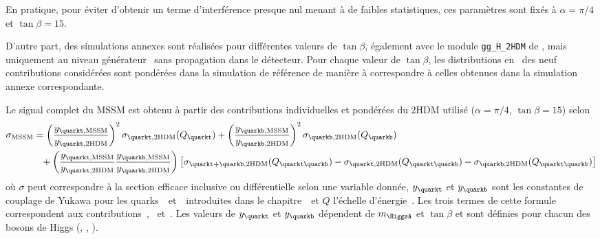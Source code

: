 En pratique, pour éviter d'obtenir un terme d'interférence presque nul menant à de faibles statistiques, ces paramètres sont fixés à $\alpha=\pi/4$ et $\tan\beta=15$.
\par
D'autre part, des simulations annexes sont réalisées pour différentes valeurs de $\tan\beta$, également avec le  module \texttt{gg\_H\_2HDM} de \POWHEG, mais uniquement au niveau générateur \ie\ sans propagation dans le détecteur.
Pour chaque valeur de $\tan\beta$, les distributions en \pT\ des neuf contributions considérées sont pondérées dans la simulation de référence de manière à correspondre à celles obtenues dans la simulation annexe correspondante.
\par
Le signal complet du MSSM est obtenu à partir des contributions individuelles et pondérées du 2HDM utilisé ($\alpha=\pi/4$, $\tan\beta=15$) selon
\begin{align}
\sigma_\text{MSSM} &=
\left(\frac{y_{\quarkt,\text{MSSM}}}{y_{\quarkt,\text{2HDM}}}\right)^2 \sigma_{\quarkt,\text{2HDM}}(Q_{\quarkt})
+
\left(\frac{y_{\quarkb,\text{MSSM}}}{y_{\quarkb,\text{2HDM}}}\right)^2 \sigma_{\quarkb,\text{2HDM}}(Q_{\quarkb})
\nonumber\\&\hphantom{=}
+
\left(\frac{y_{\quarkt,\text{MSSM}}}{y_{\quarkt,\text{2HDM}}}\frac{y_{\quarkb,\text{MSSM}}}{y_{\quarkb,\text{2HDM}}}\right)
\left[ \sigma_{\quarkt+\quarkb,\text{2HDM}}(Q_{\quarkt\quarkb}) - \sigma_{\quarkt,\text{2HDM}}(Q_{\quarkt\quarkb}) - \sigma_{\quarkb,\text{2HDM}}(Q_{\quarkt\quarkb}) \right]
\label{eq-2HDM_to_MSSM_xsec}
\end{align}
où $\sigma$ peut correspondre à la section efficace inclusive ou différentielle selon une variable donnée,
$y_{\quarkt}$ et $y_{\quarkb}$ sont les constantes de couplage de Yukawa pour les quarks~\quarkt\ et~\quarkb\ introduites dans le chapitre~\ 
et $Q$ l'échelle d'énergie~\cite{Bagnaschi:2015qta,Bagnaschi:2015bop}.
Les trois termes de cette formule correspondent aux contributions~\quarkt, \quarkb\ et~\quarkt\quarkb.
Les valeurs de $y_{\quarkt}$ et $y_{\quarkb}$ dépendent de $m_{\HiggsA}$ et $\tan\beta$ et sont définies pour chacun des bosons de Higgs (\higgs, \Higgs, \HiggsA).